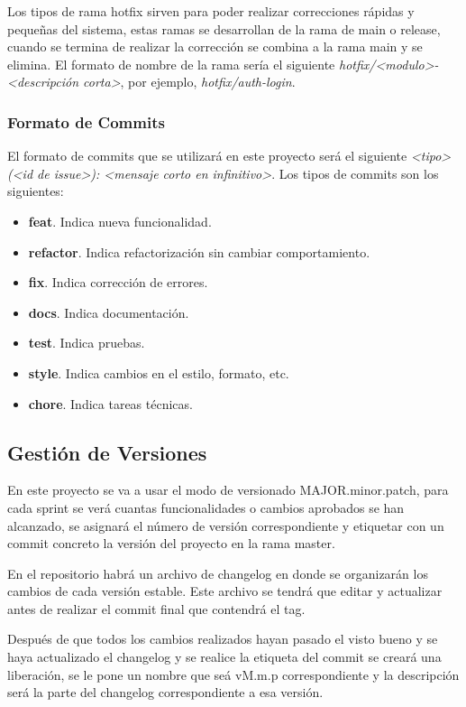 Los tipos de rama hotfix sirven para poder realizar correcciones rápidas y pequeñas del sistema, estas ramas se desarrollan de la rama de main o release, cuando se termina de realizar la corrección se combina a la rama main y se elimina. El formato de nombre de la rama sería el siguiente \textit{hotfix/<modulo>-<descripción corta>}, por ejemplo, \textit{hotfix/auth-login}.

\subsubsection{Formato de Commits}

El formato de commits que se utilizará en este proyecto será el siguiente \textit{<tipo>(<id de issue>): <mensaje corto en infinitivo>}. Los tipos de commits son los siguientes:
\begin{itemize}
    \item \textbf{feat}. Indica nueva funcionalidad.
    \item \textbf{refactor}. Indica refactorización sin cambiar comportamiento.
    \item \textbf{fix}. Indica corrección de errores.
    \item \textbf{docs}. Indica documentación.
    \item \textbf{test}. Indica pruebas.
    \item \textbf{style}. Indica cambios en el estilo, formato, etc.
    \item \textbf{chore}. Indica tareas técnicas.
\end{itemize}

\subsection{Gestión de Versiones}

En este proyecto se va a usar el modo de versionado MAJOR.minor.patch, para cada sprint se verá cuantas funcionalidades o cambios aprobados se han alcanzado, se asignará el número de versión correspondiente y etiquetar con un commit concreto la versión del proyecto en la rama master.

En el repositorio habrá un archivo de changelog en donde se organizarán los cambios de cada versión estable. Este archivo se tendrá que editar y actualizar antes de realizar el commit final que contendrá el tag.

Después de que todos los cambios realizados hayan pasado el visto bueno y se haya actualizado el changelog y se realice la etiqueta del commit se creará una liberación, se le pone un nombre que seá vM.m.p correspondiente y la descripción será la parte del changelog correspondiente a esa versión.

